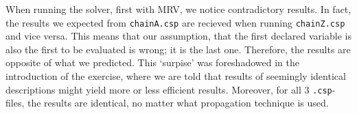 \documentclass{article}
\begin{document}
When running the solver, first with MRV, we notice contradictory results. In fact, the results we expected from \verb|chainA.csp| are recieved when running \verb|chainZ.csp| and vice versa. This means that our assumption, that the first declared variable is also the first to be evaluated is wrong; it is the last one. Therefore, the results are opposite of what we predicted. This `surpise' was foreshadowed in the introduction of the exercise, where we are told that results of seemingly identical descriptions might yield more or less efficient results. Moreover, for all 3 \verb|.csp|-files, the results are identical, no matter what propagation technique is used. 

\end{document}
